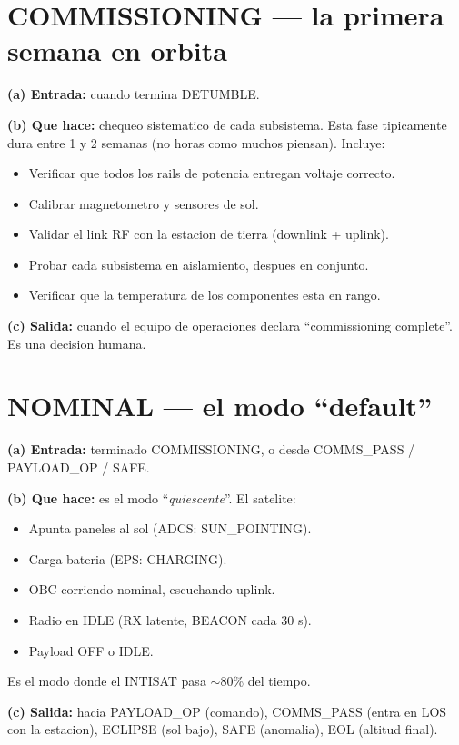 \documentclass[11pt,a4paper,oneside,openright]{book}
\begin{document}
\section{COMMISSIONING --- la primera semana en orbita}

\textbf{(a) Entrada:} cuando termina DETUMBLE.

\textbf{(b) Que hace:} chequeo sistematico de cada subsistema. Esta
fase tipicamente dura entre 1 y 2 semanas (no horas como muchos
piensan). Incluye:

\begin{itemize}[leftmargin=2em]
  \item Verificar que todos los rails de potencia entregan voltaje
    correcto.
  \item Calibrar magnetometro y sensores de sol.
  \item Validar el link RF con la estacion de tierra (downlink + uplink).
  \item Probar cada subsistema en aislamiento, despues en conjunto.
  \item Verificar que la temperatura de los componentes esta en rango.
\end{itemize}

\textbf{(c) Salida:} cuando el equipo de operaciones declara
``commissioning complete''. Es una decision humana.

\section{NOMINAL --- el modo ``default''}

\textbf{(a) Entrada:} terminado COMMISSIONING, o desde COMMS\_PASS /
PAYLOAD\_OP / SAFE.

\textbf{(b) Que hace:} es el modo ``\emph{quiescente}''. El satelite:

\begin{itemize}[leftmargin=2em]
  \item Apunta paneles al sol (ADCS: SUN\_POINTING).
  \item Carga bateria (EPS: CHARGING).
  \item OBC corriendo nominal, escuchando uplink.
  \item Radio en IDLE (RX latente, BEACON cada 30 s).
  \item Payload OFF o IDLE.
\end{itemize}

Es el modo donde el INTISAT pasa $\sim$80\% del tiempo.

\textbf{(c) Salida:} hacia PAYLOAD\_OP (comando), COMMS\_PASS (entra
en LOS con la estacion), ECLIPSE (sol bajo), SAFE (anomalia), EOL
(altitud final).
\end{document}
